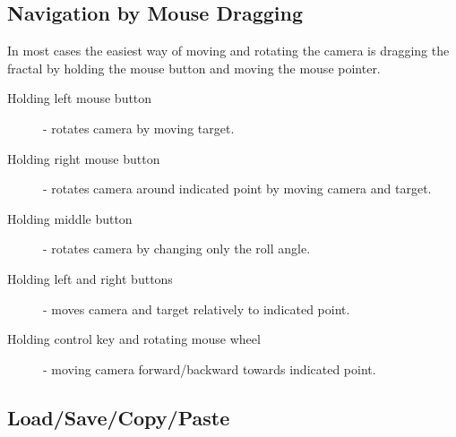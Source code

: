 \subsection{Navigation by Mouse Dragging}\label{qsg-mouse-dragging}

In most cases the easiest way of moving and rotating the camera is dragging the fractal by holding the mouse button and moving the mouse pointer.

\begin{description}
	\item[Holding left mouse button] - rotates camera by moving target.
	\item[Holding right mouse button] - rotates camera around indicated point by moving camera and target.
	\item[Holding middle button] - rotates camera by changing only the roll angle.
	\item[Holding left and right buttons] - moves camera and target relatively to indicated point.
	\item[Holding control key and rotating mouse wheel] - moving camera forward/backward towards indicated point.

\end{description}

\subsection{Load/Save/Copy/Paste}\label{qsg-load-save}

